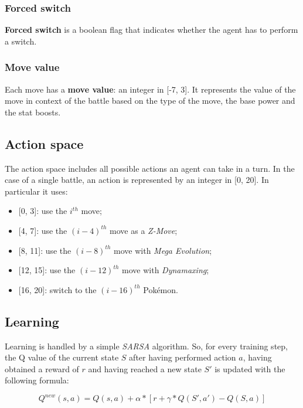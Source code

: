 \documentclass{article}
\begin{document}
\subsubsection{Forced switch}

\textbf{Forced switch} is a boolean flag that indicates whether the agent has to perform a switch.

\subsubsection{Move value}

Each move has a \textbf{move value}: an integer in [-7, 3].
It represents the value of the move in context of the battle based on the type of the move, the base power and the stat boosts.

\subsection{Action space} \label{action_space}

The action space includes all possible actions an agent can take in a turn.
In the case of a single battle, an action is represented by an integer in [0, 20].
In particular it uses:
\begin{itemize}
    \item {[0, 3]}: use the $i^{th}$ move;
    \item {[4, 7]}: use the $(i - 4)^{th}$ move as a \textit{Z-Move};
    \item {[8, 11]}: use the $(i - 8)^{th}$ move with \textit{Mega Evolution};
    \item {[12, 15]}: use the $(i - 12)^{th}$ move with \textit{Dynamaxing};
    \item {[16, 20]}: switch to the $(i - 16)^{th}$ Pokémon.
\end{itemize}

\subsection{Learning} \label{Sarsa_eq}

Learning is handled by a simple \textit{SARSA} algorithm.
So, for every training step, the Q value of the current state $S$ after having performed action $a$, having obtained a reward of $r$ and having reached a new state $S'$ is updated with the following formula:

\begin{equation}
    Q^{new}(s, a) = Q(s, a) + \alpha * [r + \gamma * Q(S', a') - Q(S, a)]
\end{equation}
\end{document}
